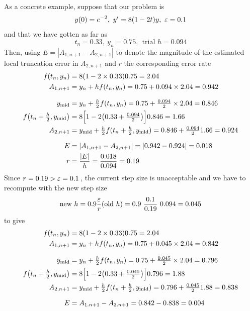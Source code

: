 \begin{eg}\label{prelim E E2}
As a concrete example, suppose that our problem is 
\begin{equation*}
y(0)=e^{-2},\ y'=8(1-2t)y,\ \varepsilon=0.1
\end{equation*}
and that we have gotten as far as
\begin{equation*}
t_n=0.33,\ y_n=0.75,\ \ \text{trial }h=0.094
\end{equation*}
Then, using $E=|A_{1,n+1}-A_{2,n+1}|$ to denote the magnitude of the 
estimated local truncation error in $A_{2,n+1}$ and $r$ the corresponding 
error rate
\begin{align*}
f(t_n,y_n)&=8(1-2\times 0.33) 0.75=2.04 \\
A_{1,n+1}&=y_n+hf(t_n,y_n)=0.75+0.094\times 2.04=0.942 \\[0.1in]
y_{\rm mid}&=y_n+\tfrac{h}{2}f(t_n,y_n)
                   =0.75+\tfrac{0.094}{2}\times 2.04=0.846 \\
f\big(t_n+\tfrac{h}{2},y_{\rm mid}\big)
&=8\Big[1-2\big(0.33+\tfrac{0.094}{2}\big)\Big]0.846=1.66 \\
A_{2,n+1}&=y_{\rm mid}+\tfrac{h}{2}f(t_n+\tfrac{h}{2},y_{\rm mid})
          =0.846+\tfrac{0.094}{2}1.66=0.924\\[0.1in]
E&=|A_{1,n+1}-A_{2,n+1}|=|0.942-0.924|=0.018\\
r&=\frac{|E|}{h}=\frac{0.018}{0.094}=0.19
\end{align*}
Since $r=0.19>\varepsilon=0.1\,$, the current step size  
is unacceptable and we have to recompute with the new step size
\begin{equation*}
\text{new } h=0.9\frac{\varepsilon}{r}(\text{old }h)
            =0.9\ \frac{0.1}{0.19}\ 0.094
            =0.045
\end{equation*}
to give
\begin{align*}
f(t_n,y_n)&=8(1-2\times0.33)0.75=2.04 \\
A_{1,n+1}&=y_n+hf(t_n,y_n)=0.75+0.045\times 2.04=0.842 \\[0.1in]
y_{\rm mid}&=y_n+\tfrac{h}{2}f(t_n,y_n)
                 =0.75+\tfrac{0.045}{2}\times 2.04=0.796 \\
f\big(t_n+\tfrac{h}{2},y_{\rm mid}\big)
&=8\Big[1-2\big(0.33+\tfrac{0.045}{2}\big)\Big]0.796=1.88 \\
A_{2,n+1}&=y_{\text{mid}}
               +\tfrac{h}{2}f(t_n +\tfrac{h}{2},y_{\rm mid})
          =0.796+\tfrac{0.045}{2}1.88
          =0.838 \\[0.1in]
E&=A_{1.n+1}-A_{2.n+1}=0.842-0.838=0.004 \\

\end{align*}
\end{eg}
